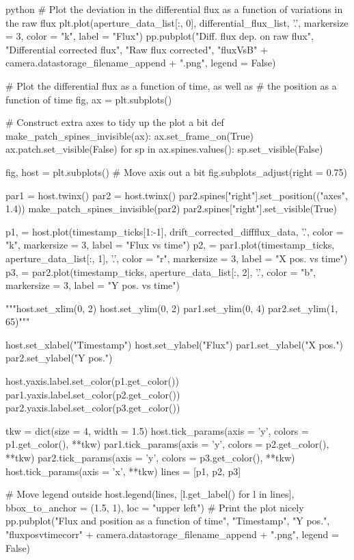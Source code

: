 \documentclass[../main.tex]{subfiles}
\begin{document}
\begin{mintedbox}{python}
# Plot the deviation in the differential flux as a function of variations in the raw flux
plt.plot(aperture_data_list[:, 0], differential_flux_list, '.', markersize  =  3, color  =  "k", label  =  "Flux")
pp.pubplot("Diff. flux dep. on raw flux", "Differential corrected flux", "Raw flux corrected",
"fluxVsB" + camera.datastorage_filename_append + ".png", legend  =  False)

# Plot the differential flux as a function of time, as well as
# the position as a function of time
fig, ax  =  plt.subplots()

# Construct extra axes to tidy up the plot a bit
def make_patch_spines_invisible(ax):
ax.set_frame_on(True)
ax.patch.set_visible(False)
for sp in ax.spines.values():
sp.set_visible(False)

fig, host  =  plt.subplots()
# Move axis out a bit
fig.subplots_adjust(right  =  0.75)

par1  =  host.twinx()
par2  =  host.twinx()
par2.spines["right"].set_position(("axes", 1.4))
make_patch_spines_invisible(par2)
par2.spines["right"].set_visible(True)

p1,  =  host.plot(timestamp_ticks[1:-1], drift_corrected_diffflux_data, '.', color  =  "k", markersize  =  3,
label  =  "Flux vs time")
p2,  =  par1.plot(timestamp_ticks, aperture_data_list[:, 1], '.', color  =  "r", markersize  =  3,
label  =  "X pos. vs time")
p3,  =  par2.plot(timestamp_ticks, aperture_data_list[:, 2], '.', color  =  "b", markersize  =  3,
label  =  "Y pos. vs time")

"""host.set_xlim(0, 2)
host.set_ylim(0, 2)
par1.set_ylim(0, 4)
par2.set_ylim(1, 65)"""

host.set_xlabel("Timestamp")
host.set_ylabel("Flux")
par1.set_ylabel("X pos.")
par2.set_ylabel("Y pos.")

host.yaxis.label.set_color(p1.get_color())
par1.yaxis.label.set_color(p2.get_color())
par2.yaxis.label.set_color(p3.get_color())

tkw  =  dict(size  =  4, width  =  1.5)
host.tick_params(axis  =  'y', colors  =  p1.get_color(), **tkw)
par1.tick_params(axis  =  'y', colors  =  p2.get_color(), **tkw)
par2.tick_params(axis  =  'y', colors  =  p3.get_color(), **tkw)
host.tick_params(axis  =  'x', **tkw)
lines  =  [p1, p2, p3]

# Move legend outside
host.legend(lines, [l.get_label() for l in lines], bbox_to_anchor  =  (1.5, 1), loc  =  "upper left")
# Print the plot nicely
pp.pubplot("Flux and position as a function of time", "Timestamp", "Y pos.",
"fluxposvtimecorr" + camera.datastorage_filename_append + ".png", legend  =  False)



\end{mintedbox}
\end{document}
